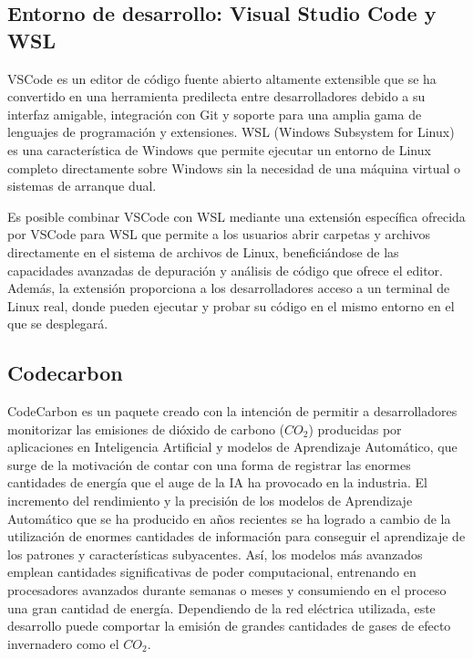 \subsection{Entorno de desarrollo: Visual Studio Code y WSL}
\label{sec:dev-env}


VSCode es un editor de código fuente abierto altamente extensible que se ha convertido en una herramienta predilecta entre desarrolladores debido a su interfaz amigable, integración con Git y soporte para una amplia gama de lenguajes de programación y extensiones. WSL (Windows Subsystem for Linux) es una característica de Windows que permite ejecutar un entorno de Linux completo directamente sobre Windows sin la necesidad de una máquina virtual o sistemas de arranque dual.

Es posible combinar VSCode con WSL mediante una extensión específica ofrecida por VSCode para WSL que permite a los usuarios abrir carpetas y archivos directamente en el sistema de archivos de Linux, beneficiándose de las capacidades avanzadas de depuración y análisis de código que ofrece el editor. Además, la extensión proporciona a los desarrolladores acceso a un terminal de Linux real, donde pueden ejecutar y probar su código en el mismo entorno en el que se desplegará. 


\subsection{Codecarbon}

CodeCarbon \cite{codecarbon}\cite{codecarbon-software} es un paquete creado con la intención de permitir a desarrolladores monitorizar las emisiones de dióxido de carbono ($CO_{2}$) producidas por aplicaciones en Inteligencia Artificial y modelos de Aprendizaje Automático, que surge de la motivación de contar con una forma de registrar las enormes cantidades de energía que el auge de la IA ha provocado en la industria. El incremento del rendimiento y la precisión de los modelos de Aprendizaje Automático que se ha producido en años recientes se ha logrado a cambio de la utilización de enormes cantidades de información para conseguir el aprendizaje de los patrones y características subyacentes. Así, los modelos más avanzados emplean cantidades significativas de poder computacional, entrenando en procesadores avanzados durante semanas o meses y consumiendo en el proceso una gran cantidad de energía. Dependiendo de la red eléctrica utilizada, este desarrollo puede comportar la emisión de grandes cantidades de gases de efecto invernadero como el $CO_{2}$.

